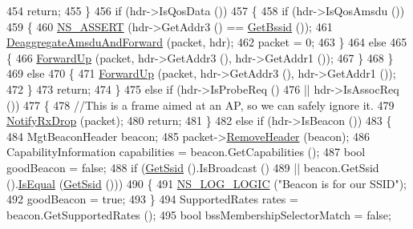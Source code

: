\begin{DoxyCode}
454           \textcolor{keywordflow}{return};
455         \}
456       \textcolor{keywordflow}{if} (hdr->IsQosData ())
457         \{
458           \textcolor{keywordflow}{if} (hdr->IsQosAmsdu ())
459             \{
460               \hyperlink{assert_8h_a6dccdb0de9b252f60088ce281c49d052}{NS\_ASSERT} (hdr->GetAddr3 () == \hyperlink{classns3_1_1RegularWifiMac_acd1705832e3f4a235c2ca6a84b5a577b}{GetBssid} ());
461               \hyperlink{classns3_1_1RegularWifiMac_a21621ca70e5d272de72d0609eb43cf15}{DeaggregateAmsduAndForward} (packet, hdr);
462               packet = 0;
463             \}
464           \textcolor{keywordflow}{else}
465             \{
466               \hyperlink{classns3_1_1RegularWifiMac_a34df292af97e69fefda8303cdb323d1d}{ForwardUp} (packet, hdr->GetAddr3 (), hdr->GetAddr1 ());
467             \}
468         \}
469       \textcolor{keywordflow}{else}
470         \{
471           \hyperlink{classns3_1_1RegularWifiMac_a34df292af97e69fefda8303cdb323d1d}{ForwardUp} (packet, hdr->GetAddr3 (), hdr->GetAddr1 ());
472         \}
473       \textcolor{keywordflow}{return};
474     \}
475   \textcolor{keywordflow}{else} \textcolor{keywordflow}{if} (hdr->IsProbeReq ()
476            || hdr->IsAssocReq ())
477     \{
478       \textcolor{comment}{//This is a frame aimed at an AP, so we can safely ignore it.}
479       \hyperlink{classns3_1_1WifiMac_acc2ef3079b2a6ac4fb3838608e5e1ed4}{NotifyRxDrop} (packet);
480       \textcolor{keywordflow}{return};
481     \}
482   \textcolor{keywordflow}{else} \textcolor{keywordflow}{if} (hdr->IsBeacon ())
483     \{
484       MgtBeaconHeader beacon;
485       packet->\hyperlink{classns3_1_1Packet_a0961eccf975d75f902d40956c93ba63e}{RemoveHeader} (beacon);
486       CapabilityInformation capabilities = beacon.GetCapabilities ();
487       \textcolor{keywordtype}{bool} goodBeacon = \textcolor{keyword}{false};
488       \textcolor{keywordflow}{if} (\hyperlink{classns3_1_1RegularWifiMac_a3cd4316ccd72111fa94f7091d4deb521}{GetSsid} ().IsBroadcast ()
489           || beacon.GetSsid ().\hyperlink{classns3_1_1Ssid_a25edb9668c80bd9dc4bd93b8ea86fe6c}{IsEqual} (\hyperlink{classns3_1_1RegularWifiMac_a3cd4316ccd72111fa94f7091d4deb521}{GetSsid} ()))
490         \{
491           \hyperlink{group__logging_ga88acd260151caf2db9c0fc84997f45ce}{NS\_LOG\_LOGIC} (\textcolor{stringliteral}{"Beacon is for our SSID"});
492           goodBeacon = \textcolor{keyword}{true};
493         \}
494       SupportedRates rates = beacon.GetSupportedRates ();
495       \textcolor{keywordtype}{bool} bssMembershipSelectorMatch = \textcolor{keyword}{false};

\end{DoxyCode}
